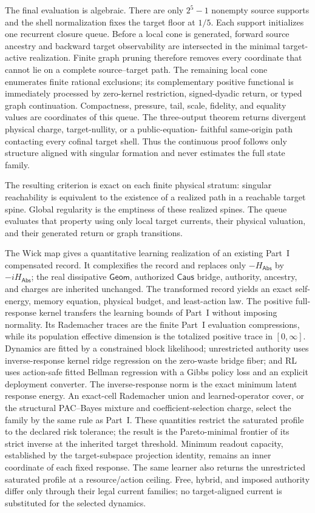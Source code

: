 \documentclass[11pt]{article}
\numberwithin{section}{part}
\theoremstyle{plain}
\theoremstyle{definition}
\theoremstyle{remark}
\newcommand{\Geom}{\mathsf{Geom}}
\newcommand{\Caus}{\mathsf{Caus}}
\newcommand{\Abs}{\mathsf{Abs}}
\begin{document}
The final evaluation is algebraic.  There are only \(2^5-1\) nonempty source
supports and the shell normalization fixes the target floor at \(1/5\).
Each support initializes one recurrent closure queue.  Before a local cone
is generated, forward source ancestry and backward target observability are
intersected in the minimal target-active realization.  Finite graph pruning
therefore removes every coordinate that cannot lie on a complete
source--target path.  The remaining local cone
enumerates finite rational exclusions; its complementary positive functional
is immediately processed by zero-kernel restriction, signed-dyadic return,
or typed graph continuation.  Compactness, pressure, tail, scale, fidelity,
and equality values are coordinates of this queue.  The three-output theorem
returns divergent physical charge, target-nullity, or a public-equation-
faithful same-origin path contacting every cofinal target shell.  Thus the
continuous proof follows only structure aligned with singular formation and
never estimates the full state family.

The resulting criterion is exact on each finite physical stratum:
singular reachability is equivalent to the existence of a realized path in a
reachable target spine.  Global regularity is the emptiness of these realized
spines.  The queue evaluates that property using only local target currents,
their physical valuation, and their generated return or graph transitions.

The Wick map gives a quantitative learning realization of an existing
Part~I compensated record.  It complexifies the record and replaces only
\(-H_{\Abs}\) by \(-iH_{\Abs}\); the real dissipative \(\Geom\), authorized
\(\Caus\) bridge, authority, ancestry, and charges are inherited unchanged.
The transformed record yields an exact self-energy, memory equation, physical
budget, and least-action law.  The positive full-
response kernel transfers the learning bounds of Part~I without imposing
normality.  Its Rademacher traces are the finite Part~I evaluation
compressions, while its population effective dimension is the totalized
positive trace in \([0,\infty]\).  Dynamics are fitted by a constrained block likelihood;
unrestricted authority uses inverse-response kernel ridge regression on the
zero-waste bridge fiber; and RL uses action-safe fitted Bellman regression
with a Gibbs policy loss and an explicit deployment converter.  The
inverse-response norm is the exact minimum latent response energy.  An
exact-cell Rademacher union and learned-operator cover, or the structural
PAC--Bayes mixture and coefficient-selection charge, select the family by the
same rule as Part~I.  These quantities restrict the saturated profile to the
declared risk tolerance; the result is the Pareto-minimal frontier of its
strict inverse at the inherited target threshold.  Minimum readout capacity,
established by the target-subspace projection identity, remains an inner
coordinate of each fixed response.  The same learner also returns the
unrestricted saturated profile at a resource/action ceiling.  Free, hybrid,
and imposed authority differ only through
their legal current families; no target-aligned current is substituted for
the selected dynamics.
\end{document}
